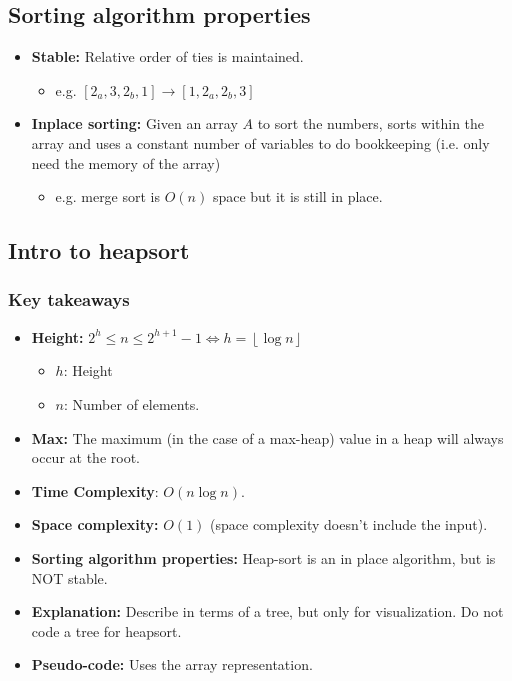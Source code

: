 \subsection{Sorting algorithm properties}
\begin{definition}
    \begin{itemize}
        \item \textbf{Stable:} Relative order of ties is maintained.
        \begin{itemize}
            \item e.g. $[2_a,3,2_b,1]\rightarrow [1,2_a,2_b,3]$
        \end{itemize}
        \item \textbf{Inplace sorting:} Given an array \( A \) to sort the numbers, sorts within the array and uses a constant number of variables to do bookkeeping (i.e. only need the memory of the array)
        \begin{itemize}
            \item e.g. merge sort is $O(n)$ space but it is still in place.
        \end{itemize}
    \end{itemize}
\end{definition}

\subsection{Intro to heapsort}
    \subsubsection{Key takeaways}
    \begin{intuition}
        \begin{itemize}
            \item \textbf{Height:} $2^h \leq n \leq 2^{h+1} - 1 \iff h = \left\lfloor \log n \right\rfloor $
            \begin{itemize}
                \item $h$: Height
                \item $n$: Number of elements.
            \end{itemize}
            \item \textbf{Max:} The maximum (in the case of a max-heap) value in a heap will always occur at the root.
            \item \textbf{Time Complexity}: \( O(n \log n) \).
            \item \textbf{Space complexity:} $O(1)$ (space complexity doesn't include the input).
            \item \textbf{Sorting algorithm properties:} Heap-sort is an in place algorithm, but is NOT stable.
            \item \textbf{Explanation:} Describe in terms of a tree, but only for visualization. Do not code a tree for heapsort.
            \item \textbf{Pseudo-code:} Uses the array representation.
        \end{itemize}
    \end{intuition}

